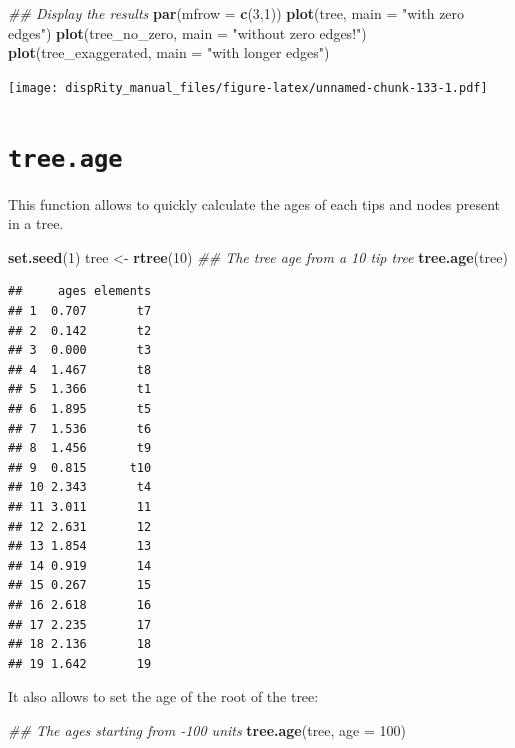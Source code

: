 \documentclass[]{book}
\newenvironment{Shaded}{\begin{snugshade}}{\end{snugshade}}
\newcommand{\CommentTok}[1]{\textcolor[rgb]{0.56,0.35,0.01}{\textit{#1}}}
\newcommand{\DataTypeTok}[1]{\textcolor[rgb]{0.13,0.29,0.53}{#1}}
\newcommand{\DecValTok}[1]{\textcolor[rgb]{0.00,0.00,0.81}{#1}}
\newcommand{\KeywordTok}[1]{\textcolor[rgb]{0.13,0.29,0.53}{\textbf{#1}}}
\newcommand{\NormalTok}[1]{#1}
\newcommand{\StringTok}[1]{\textcolor[rgb]{0.31,0.60,0.02}{#1}}
\begin{document}
\begin{Shaded}
\begin{Highlighting}[]
\CommentTok{## Display the results}
\KeywordTok{par}\NormalTok{(}\DataTypeTok{mfrow =} \KeywordTok{c}\NormalTok{(}\DecValTok{3}\NormalTok{,}\DecValTok{1}\NormalTok{))}
\KeywordTok{plot}\NormalTok{(tree, }\DataTypeTok{main =} \StringTok{"with zero edges"}\NormalTok{)}
\KeywordTok{plot}\NormalTok{(tree_no_zero, }\DataTypeTok{main =} \StringTok{"without zero edges!"}\NormalTok{)}
\KeywordTok{plot}\NormalTok{(tree_exaggerated, }\DataTypeTok{main =} \StringTok{"with longer edges"}\NormalTok{)}
\end{Highlighting}
\end{Shaded}

\texttt{[image: dispRity\_manual\_files/figure-latex/unnamed-chunk-133-1.pdf]}

\hypertarget{tree.age}{%
\section{\texorpdfstring{\texttt{tree.age}}{tree.age}}\label{tree.age}}

This function allows to quickly calculate the ages of each tips and nodes present in a tree.

\begin{Shaded}
\begin{Highlighting}[]
\KeywordTok{set.seed}\NormalTok{(}\DecValTok{1}\NormalTok{)}
\NormalTok{tree <-}\StringTok{ }\KeywordTok{rtree}\NormalTok{(}\DecValTok{10}\NormalTok{)}
\CommentTok{## The tree age from a 10 tip tree}
\KeywordTok{tree.age}\NormalTok{(tree)}
\end{Highlighting}
\end{Shaded}

\begin{verbatim}
##     ages elements
## 1  0.707       t7
## 2  0.142       t2
## 3  0.000       t3
## 4  1.467       t8
## 5  1.366       t1
## 6  1.895       t5
## 7  1.536       t6
## 8  1.456       t9
## 9  0.815      t10
## 10 2.343       t4
## 11 3.011       11
## 12 2.631       12
## 13 1.854       13
## 14 0.919       14
## 15 0.267       15
## 16 2.618       16
## 17 2.235       17
## 18 2.136       18
## 19 1.642       19
\end{verbatim}

It also allows to set the age of the root of the tree:

\begin{Shaded}
\begin{Highlighting}[]
\CommentTok{## The ages starting from -100 units}
\KeywordTok{tree.age}\NormalTok{(tree, }\DataTypeTok{age =} \DecValTok{100}\NormalTok{)}
\end{Highlighting}
\end{Shaded}
\end{document}
